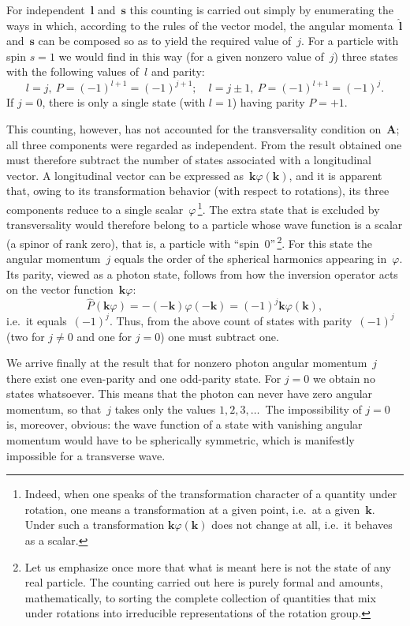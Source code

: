 For independent~$\mathbf{l}$ and~$\mathbf{s}$ this counting is carried out simply by enumerating the ways in which, according to the rules of the vector model, the angular momenta~$\hat{\mathbf{l}}$ and~$\mathbf{s}$ can be composed so as to yield the required value of~$j$. For a particle with spin $s = 1$ we would find in this way (for a given nonzero value of~$j$) three states with the following values of~$l$ and parity:
\[
l = j,\ P = (-1)^{l+1} = (-1)^{j+1}; \quad l = j\pm 1,\ P = (-1)^{l+1} = (-1)^j.
\]
If $j = 0$, there is only a single state (with $l = 1$) having parity $P = +1$.

This counting, however, has not accounted for the transversality condition on~$\mathbf{A}$; all three components were regarded as independent. From the result obtained one must therefore subtract the number of states associated with a longitudinal vector. A longitudinal vector can be expressed as~$\mathbf{k}\varphi(\mathbf{k})$, and it is apparent that, owing to its transformation behavior (with respect to rotations), its three components reduce to a single scalar~$\varphi$\,\footnote{Indeed, when one speaks of the transformation character of a quantity under rotation, one means a transformation at a given point, i.e.\ at a given~$\mathbf{k}$. Under such a transformation $\mathbf{k}\varphi(\mathbf{k})$ does not change at all, i.e.\ it behaves as a scalar.}. The extra state that is excluded by transversality would therefore belong to a particle whose wave function is a scalar (a spinor of rank zero), that is, a particle with ``spin~0''\,\footnote{Let us emphasize once more that what is meant here is not the state of any real particle. The counting carried out here is purely formal and amounts, mathematically, to sorting the complete collection of quantities that mix under rotations into irreducible representations of the rotation group.}. For this state the angular momentum~$j$ equals the order of the spherical harmonics appearing in~$\varphi$. Its parity, viewed as a photon state, follows from how the inversion operator acts on the vector function~$\mathbf{k}\varphi$:
\[
\hat{P}(\mathbf{k}\varphi) = -(-\mathbf{k})\varphi(-\mathbf{k}) = (-1)^j\mathbf{k}\varphi(\mathbf{k}),
\]
i.e.\ it equals~$(-1)^j$. Thus, from the above count of states with parity~$(-1)^j$ (two for $j \neq 0$ and one for $j = 0$) one must subtract one.

We arrive finally at the result that for nonzero photon angular momentum~$j$ there exist one even-parity and one odd-parity state. For $j = 0$ we obtain no states whatsoever. This means that the photon can never have zero angular momentum, so that~$j$ takes only the values $1, 2, 3, \ldots$\, The impossibility of $j = 0$ is, moreover, obvious: the wave function of a state with vanishing angular momentum would have to be spherically symmetric, which is manifestly impossible for a transverse wave.

